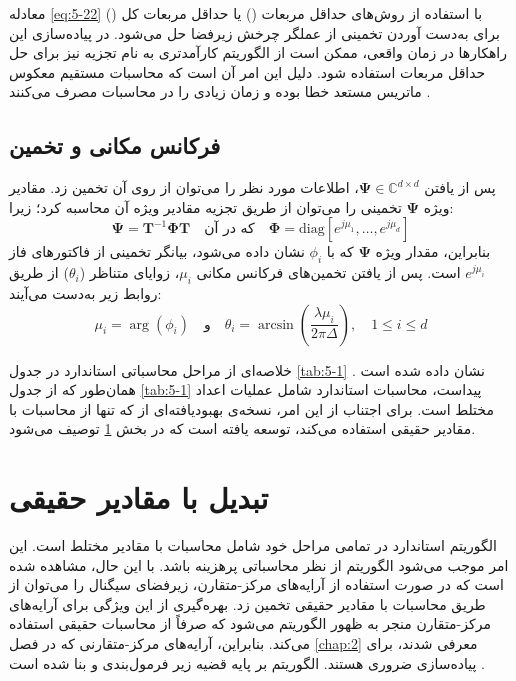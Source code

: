 معادله \eqref{eq:5-22} با استفاده از روش‌های حداقل مربعات () یا حداقل مربعات کل () برای به‌دست آوردن تخمینی از عملگر چرخش زیرفضا حل می‌شود. در پیاده‌سازی این راهکارها در زمان واقعی، ممکن است از الگوریتم کارآمدتری به نام تجزیه  نیز برای حل حداقل مربعات استفاده شود. دلیل این امر آن است که محاسبات مستقیم معکوس ماتریس مستعد خطا بوده و زمان زیادی را در محاسبات مصرف می‌کنند \cite{5-5}.

\subsection{فرکانس مکانی و تخمین }
\label{subsec:5-3-3}
پس از یافتن $\bm{\Psi} \in \mathbb{C}^{d \times d}$، اطلاعات  مورد نظر را می‌توان از روی آن تخمین زد. مقادیر ویژه $\bm{\Psi}$ تخمینی را می‌توان از طریق تجزیه مقادیر ویژه آن محاسبه کرد؛ زیرا:
\begin{equation}
	\bm{\Psi} = \bm{T}^{-1} \bm{\Phi} \bm{T} \quad \text{که در آن} \quad \bm{\Phi} = \text{diag}[e^{j\mu_1}, \dots, e^{j\mu_d}]
	\label{eq:5-23}
\end{equation}
بنابراین، مقدار ویژه $\bm{\Psi}$ که با $\phi_i$ نشان داده می‌شود، بیانگر تخمینی از فاکتورهای فاز $e^{j\mu_i}$ است. پس از یافتن تخمین‌های فرکانس مکانی $\mu_i$، زوایای  متناظر ($\theta_i$) از طریق روابط زیر به‌دست می‌آیند:
\begin{equation}
	\mu_i = \arg(\phi_i) \quad \text{و} \quad \theta_i = \arcsin \left( \frac{\lambda \mu_i}{2\pi \Delta} \right), \quad 1 \leq i \leq d
	\label{eq:5-24}
\end{equation}

خلاصه‌ای از مراحل محاسباتی  استاندارد در جدول \ref{tab:5-1} نشان داده شده است \cite{5-1}. همان‌طور که از جدول \ref{tab:5-1} پیداست، محاسبات  استاندارد شامل عملیات اعداد مختلط است. برای اجتناب از این امر، نسخه‌ی بهبودیافته‌ای از  که تنها از محاسبات با مقادیر حقیقی استفاده می‌کند، توسعه یافته است که در بخش \ref{sec:5-4} توصیف می‌شود.


\section{تبدیل با مقادیر حقیقی}
\label{sec:5-4}
الگوریتم  استاندارد در تمامی مراحل خود شامل محاسبات با مقادیر مختلط است. این امر موجب می‌شود الگوریتم از نظر محاسباتی پرهزینه باشد. با این حال، مشاهده شده است که در صورت استفاده از آرایه‌های مرکز-متقارن، زیرفضای سیگنال را می‌توان از طریق محاسبات با مقادیر حقیقی تخمین زد. بهره‌گیری از این ویژگی برای آرایه‌های مرکز-متقارن منجر به ظهور الگوریتم  می‌شود که صرفاً از محاسبات حقیقی استفاده می‌کند. بنابراین، آرایه‌های مرکز-متقارنی که در فصل \ref{chap:2} معرفی شدند، برای پیاده‌سازی  ضروری هستند. الگوریتم  بر پایه قضیه زیر فرمول‌بندی و بنا شده است \cite{5-5}.


